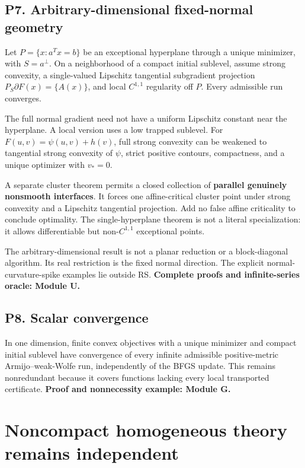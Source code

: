 \documentclass[10pt,oneside,openany]{book}
\theoremstyle{remark}\newtheorem{remark}{Remark}[chapter]
\begin{document}
\subsection{P7. Arbitrary-dimensional fixed-normal geometry}\label{p7.-arbitrary-dimensional-fixed-normal-geometry}

Let \(P=\{x:a^Tx=b\}\) be an exceptional hyperplane through a unique minimizer, with \(S=a^\perp\). On a neighborhood of a compact initial sublevel, assume strong convexity, a single-valued Lipschitz tangential subgradient projection \(P_S\partial F(x)=\{A(x)\}\), and local \(C^{1,1}\) regularity off \(P\). Every admissible run converges.

The full normal gradient need not have a uniform Lipschitz constant near the hyperplane. A local version uses a low trapped sublevel. For \(F(u,v)=\psi(u,v)+h(v)\), full strong convexity can be weakened to tangential strong convexity of \(\psi\), strict positive contours, compactness, and a unique optimizer with \(v_*=0\).

A separate cluster theorem permits a closed collection of \textbf{parallel genuinely nonsmooth interfaces}. It forces one affine-critical cluster point under strong convexity and a Lipschitz tangential projection. Add no false affine criticality to conclude optimality. The single-hyperplane theorem is not a literal specialization: it allows differentiable but non-\(C^{1,1}\) exceptional points.

The arbitrary-dimensional result is not a planar reduction or a block-diagonal algorithm. Its real restriction is the fixed normal direction. The explicit normal-curvature-spike examples lie outside RS. \textbf{Complete proofs and infinite-series oracle: Module U.}

\subsection{P8. Scalar convergence}\label{p8.-scalar-convergence}

In one dimension, finite convex objectives with a unique minimizer and compact initial sublevel have convergence of every infinite admissible positive-metric Armijo--weak-Wolfe run, independently of the BFGS update. This remains nonredundant because it covers functions lacking every local transported certificate. \textbf{Proof and nonnecessity example: Module G.}

\section{Noncompact homogeneous theory remains independent}\label{noncompact-homogeneous-theory-remains-independent}
\end{document}
